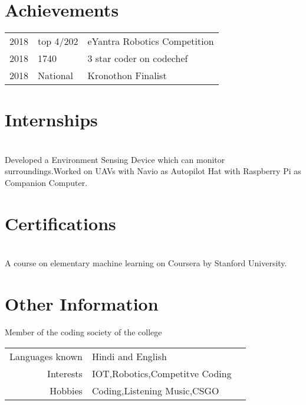 \documentclass[]{resume}
\begin{document}
\begin{minipage}[t]{0.66\textwidth}

\section{Achievements} 
\begin{tabular}{rll}
2018	     & top 4/202  & eYantra Robotics Competition\\
2018	     & 1740  & 3 star coder on codechef\\
2018	     & National  & Kronothon Finalist
\end{tabular}
\sectionsep
\section{Internships }

\\
Developed a Environment Sensing Device which can monitor surroundings.Worked on UAVs with Navio as Autopilot Hat with Raspberry Pi as Companion Computer. 
\sectionsep
\section{Certifications }
\\
A course on elementary machine learning on Coursera by Stanford University.
\sectionsep
\section{Other Information }
Member of the coding society of the college\\
\begin{tabular}{rll}
Languages known & Hindi and English\\
Interests & IOT,Robotics,Competitve Coding\\
Hobbies & Coding,Listening Music,CSGO
\end{tabular}
\sectionsep
\end{minipage} 
\end{document}
